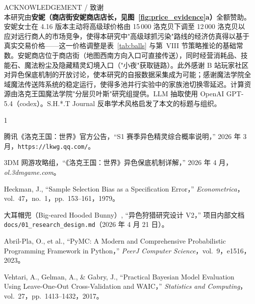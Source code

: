 \documentclass[journal]{IEEEtran}
\begin{document}
ACKNOWLEDGEMENT / 致谢\\
本研究由\textbf{安妮（商店街安妮商店店长，见图~\ref{fig:price_evidence}a）}全额赞助。安妮女士在 4.16 版本主动将高级球价格由 15\,000 洛克贝下调至 12\,000 洛克贝以应对远行商人的市场竞争，使得本研究中"高级球抓污染"路线的经济仿真得以基于真实交易价格——这一价格调整是表~\ref{tab:balls} 与第~VIII 节策略推论的基础常数。安妮商店位于商店街（地图西南方向入口可直接传送），同时经营消耗品、技能石、魔法粉尘及隐藏精灵幻境入口（"小夜"获取链路）。此外感谢 B 站玩家社区对异色保底机制的开放讨论，使本研究的自报数据采集成为可能；感谢魔法学院全域魔法传送阵系统的稳定运行，使得多池并行实验中的家族池切换零延迟。计算资源由洛克王国魔法学院"分层贝叶斯"研究组提供。LLM 抽取使用 OpenAI GPT-5.4（codex）。S.H.*.T Journal 反串学术风格启发了本文的标题与组织。


\enlargethispage{12\baselineskip}
\scriptsize
\setlength{\itemsep}{-2pt}
\setlength{\parsep}{0pt}
\begin{thebibliography}{1}

 腾讯《洛克王国：世界》官方公告，``S1 赛季异色精灵综合概率说明，'' 2026 年 3 月，\texttt{https://lkwg.qq.com/}。

 3DM 网游攻略组，``《洛克王国：世界》异色保底机制详解，'' 2026 年 4 月，\textit{ol.3dmgame.com}。

 Heckman, J., ``Sample Selection Bias as a Specification Error，'' \textit{Econometrica}，vol.~47，no.~1，pp.~153--161，1979。

 大耳帽兜（Big-eared Hooded Bunny）, ``异色狩猎研究设计 V2，'' 项目内部文档 \texttt{docs/01\_research\_design.md}（2026 年 4 月 21 日）。

 Abril-Pla, O., et al., ``PyMC: A Modern and Comprehensive Probabilistic Programming Framework in Python，'' \textit{PeerJ Computer Science}，vol.~9，e1516，2023。

 Vehtari, A., Gelman, A., \& Gabry, J., ``Practical Bayesian Model Evaluation Using Leave-One-Out Cross-Validation and WAIC，'' \textit{Statistics and Computing}，vol.~27，pp.~1413--1432，2017。

\end{thebibliography}
\end{document}
